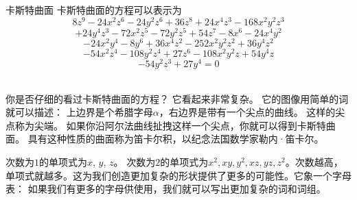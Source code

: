 ﻿\begin{surferPage}{卡斯特曲面}
卡斯特曲面的方程可以表示为 
  \smallskip
\[8z^9-24x^2z^6-24y^2z^6+36z^8+24x^4z^3-168x^2y^2z^3\]
\[+24y^4z^3-72x^2z^5-72y^2z^5+54z^7-8x^6-24x^4y^2\]
\[-24x^2y^4-8y^6 + 36x^4z^2-252x^2y^2z^2+36y^4z^2\]
\[- 54x^2z^4-108y^2z^4 + 27z^6-108x^2y^2z + 54y^4z\]
\[-54y^2z^3 + 27y^4 = 0\]\\
\vspace{0.3cm}

你是否仔细的看过卡斯特曲面的方程？ 它看起来非常复杂。 它的图像用简单的词就可以描述： 上边界是个希腊字母$\alpha$，右边界是带有一个尖点的曲线。 这样的尖点称为尖端。 如果你沿阿尔法曲线扯拽这样一个尖点，你就可以得到卡斯特曲面。 具有这种性质的曲面称为笛卡尔积，以纪念法国数学家勒内·笛卡尔。\\

\vspace{0.3cm}

次数为$1$的单项式为$x$, $y$, $z$。 次数为$2$的单项式为$x^2, xy, y^2, xz, yz, z^2$。次数越高，单项式就越多。这为我们创造更加复杂的形状提供了更多的可能性。它象一个字母表： 如果我们有更多的字母供使用，我们就可以写出更加复杂的词和词组。
\end{surferPage}
